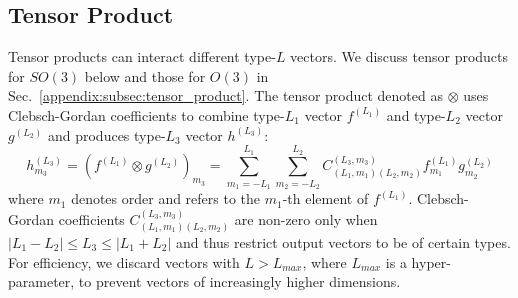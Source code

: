 \vspace{-2.5mm}
\subsection{Tensor Product}
\label{subsec:tensor_product}
\vspace{-2.5mm}
Tensor products can interact different type-$L$ vectors.
We discuss tensor products for $SO(3)$ below and those for $O(3)$ in Sec.~\ref{appendix:subsec:tensor_product}.
The tensor product denoted as $\otimes$ uses Clebsch-Gordan coefficients to combine type-$L_1$ vector $f^{(L_1)}$ and type-$L_2$ vector $g^{(L_2)}$ and produces type-$L_3$ vector $h^{(L_3)}$:
\begin{equation}
h^{(L_3)}_{m_3} = (f^{(L_1)} \otimes g^{(L_2)})_{m_3} = \sum_{m_1 = -L_1}^{L_1} \sum_{m_2 = -L_2}^{L_2} C^{(L_3, m_3)}_{(L_1, m_1)(L_2, m_2)} f^{(L_1)}_{m_1} g^{(L_2)}_{m_2} 
\label{eq:tensor_product}
\end{equation}
where $m_1$ denotes order and refers to the $m_1$-th element of $f^{(L_1)}$.
Clebsch-Gordan coefficients $C^{(L_3, m_3)}_{(L_1, m_1)(L_2, m_2)}$ are non-zero only when $| L_1 - L_2 | \leq L_3 \leq | L_1 + L_2 |$ and thus restrict output vectors to be of certain types.
For efficiency, we discard vectors with $L > L_{max}$, where $L_{max}$ is a hyper-parameter, to prevent vectors of increasingly higher dimensions.



